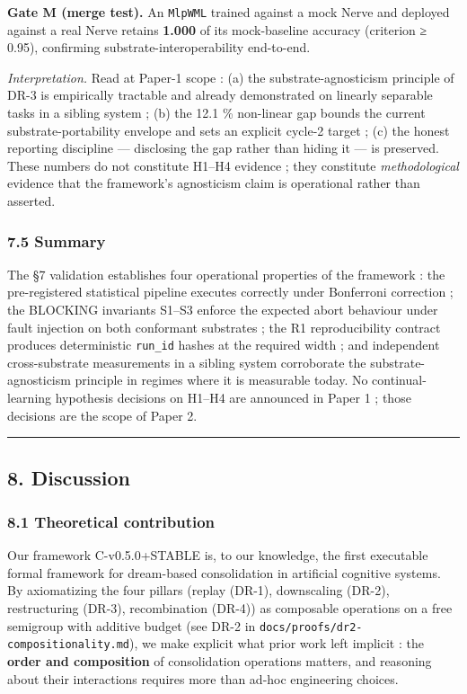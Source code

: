 \documentclass[
]{article}
\begin{document}
\textbf{Gate M (merge test).} An \texttt{MlpWML} trained against a mock
Nerve and deployed against a real Nerve retains \textbf{1.000} of its
mock-baseline accuracy (criterion ≥ 0.95), confirming
substrate-interoperability end-to-end.

\emph{Interpretation.} Read at Paper-1 scope : (a) the
substrate-agnosticism principle of DR-3 is empirically tractable and
already demonstrated on linearly separable tasks in a sibling system ;
(b) the 12.1 \% non-linear gap bounds the current substrate-portability
envelope and sets an explicit cycle-2 target ; (c) the honest reporting
discipline --- disclosing the gap rather than hiding it --- is
preserved. These numbers do not constitute H1--H4 evidence ; they
constitute \emph{methodological} evidence that the framework's
agnosticism claim is operational rather than asserted.

\subsubsection{7.5 Summary}\label{summary}

The §7 validation establishes four operational properties of the
framework : the pre-registered statistical pipeline executes correctly
under Bonferroni correction ; the BLOCKING invariants S1--S3 enforce the
expected abort behaviour under fault injection on both conformant
substrates ; the R1 reproducibility contract produces deterministic
\texttt{run\_id} hashes at the required width ; and independent
cross-substrate measurements in a sibling system corroborate the
substrate-agnosticism principle in regimes where it is measurable today.
No continual-learning hypothesis decisions on H1--H4 are announced in
Paper 1 ; those decisions are the scope of Paper 2.

\begin{center}\rule{0.5\linewidth}{0.5pt}\end{center}

\subsection{8. Discussion}\label{discussion}

\subsubsection{8.1 Theoretical
contribution}\label{theoretical-contribution}

Our framework C-v0.5.0+STABLE is, to our knowledge, the first executable
formal framework for dream-based consolidation in artificial cognitive
systems. By axiomatizing the four pillars (replay (DR-1), downscaling
(DR-2), restructuring (DR-3), recombination (DR-4)) as composable
operations on a free semigroup with additive budget (see DR-2 in
\texttt{docs/proofs/dr2-compositionality.md}), we make explicit what
prior work left implicit : the \textbf{order and composition} of
consolidation operations matters, and reasoning about their interactions
requires more than ad-hoc engineering choices.
\end{document}
